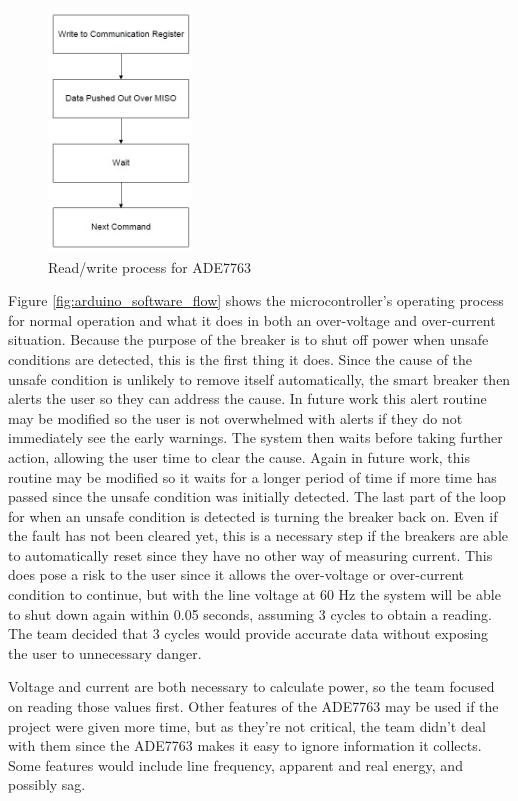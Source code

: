 \begin{figure}[htbp]
\begin{center}
\includegraphics[width=1.5in]{includes/NJADEread2} 
\caption{Read/write process for ADE7763}
\label{fig:ade_read}   
\end{center}
\end{figure}

Figure \ref{fig:arduino_software_flow} shows the microcontroller's operating process for normal operation and what it does in both an over-voltage and over-current situation. Because the purpose of the breaker is to shut off power when unsafe conditions are detected, this is the first thing it does. Since the cause of the unsafe condition is unlikely to remove itself automatically, the smart breaker then alerts the user so they can address the cause. In future work this alert routine may be modified so the user is not overwhelmed with alerts if they do not immediately see the early warnings. The system then waits before taking further action, allowing the user time to clear the cause. Again in future work, this routine may be modified so it waits for a longer period of time if more time has passed since the unsafe condition was initially detected. The last part of the loop for when an unsafe condition is detected is turning the breaker back on. Even if the fault has not been cleared yet, this is a necessary step if the breakers are able to automatically reset since they have no other way of measuring current. This does pose a risk to the user since it allows the over-voltage or over-current condition to continue, but with the line voltage at 60 Hz the system will be able to shut down again within 0.05 seconds, assuming 3 cycles to obtain a reading. The team decided that 3 cycles would provide accurate data without exposing the user to unnecessary danger. 

Voltage and current are both necessary to calculate power, so the team focused on reading those values first. Other features of the ADE7763 may be used if the project were given more time, but as they're not critical, the team didn't deal with them since the ADE7763 makes it easy to ignore information it collects. Some features would include line frequency, apparent and real energy, and possibly sag.

